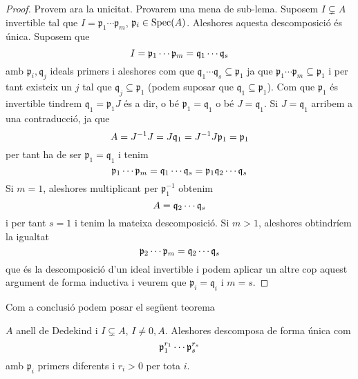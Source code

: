 \documentclass[../../../main.tex]{subfiles}
\begin{document}
\begin{proof}
Provem ara la unicitat. Provarem una mena de sub-lema. Suposem $I\varsubsetneq A$ invertible tal que $I = \mathfrak{p}_1\cdots\mathfrak{p}_m$, $\mathfrak{p}_i\in\mathrm{Spec}(A)$. Aleshores aquesta descomposició és única. Suposem que
\begin{equation}
    \notag
    I = \mathfrak{p}_1\cdots\mathfrak{p}_m = \mathfrak{q}_1\cdots\mathfrak{q}_s
\end{equation}
amb $\mathfrak{p}_i,\mathfrak{q}_j$ ideals primers i aleshores com que $\mathfrak{q}_1\cdots\mathfrak{q}_s\subseteq \mathfrak{p}_1$ ja que $\mathfrak{p}_1\cdots\mathfrak{p}_m\subseteq\mathfrak{p}_1$ i per tant existeix un $j$ tal que $\mathfrak{q}_j\subseteq\mathfrak{p}_1$ (podem suposar que $\mathfrak{q}_1\subseteq\mathfrak{p}_1$). Com que $\mathfrak{p}_1$ és invertible tindrem $\mathfrak{q}_1 = \mathfrak{p}_1J$ és a dir, o bé $\mathfrak{p}_1 = \mathfrak{q}_1$ o bé $J = \mathfrak{q}_1$. Si $J = \mathfrak{q}_1$ arribem a una contraducció, ja que 
\begin{equation}
    \notag
    A = J^{-1}J = J\mathfrak{q}_1 = J^{-1}J\mathfrak{p}_1 = \mathfrak{p}_1
\end{equation}
per tant ha de ser $\mathfrak{p}_1 = \mathfrak{q}_1$ i tenim
\begin{equation}
    \notag
    \mathfrak{p}_1\cdots\mathfrak{p}_m = \mathfrak{q}_1\cdots\mathfrak{q}_s = \mathfrak{p}_1\mathfrak{q}_2\cdots\mathfrak{q}_s
\end{equation}
Si $m = 1$, aleshores multiplicant per $\mathfrak{p}_1^{-1}$ obtenim
\begin{equation}
    \notag
    A = \mathfrak{q}_2\cdots\mathfrak{q}_s
\end{equation}
i per tant $s = 1$ i tenim la mateixa descomposició. Si $m>1$, aleshores obtindríem la igualtat
\begin{equation}
    \notag
    \mathfrak{p}_2\cdots\mathfrak{p}_m = \mathfrak{q}_2\cdots\mathfrak{q}_s
\end{equation}
que és la descomposició d'un ideal invertible i podem aplicar un altre cop aquest argument de forma inductiva i veurem que $\mathfrak{p}_i = \mathfrak{q}_i$ i $m = s$.
\end{proof}


Com a conclusió podem posar el següent teorema
\begin{ter}
[R. Dedekind]\label{ter:teoremaDeDedekind} $A$ anell de Dedekind i $I\varsubsetneq A$, $I\not=0,A$. Aleshores descomposa de forma única com
\begin{equation}
    \notag
    \mathfrak{p}_1^{r_1}\cdots\mathfrak{p}_s^{r_s}
\end{equation}
amb $\mathfrak{p}_i$ primers diferents i $r_i>0$ per tota $i$.
\end{ter}
\end{document}
